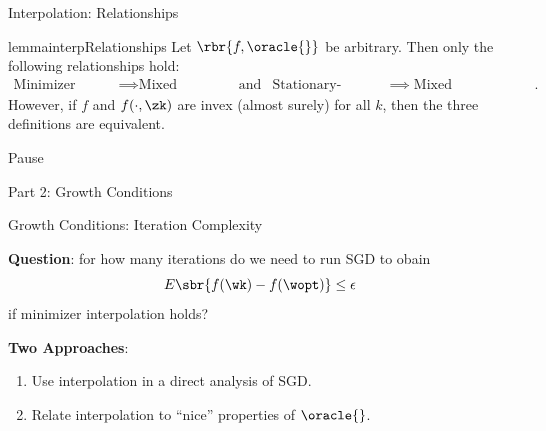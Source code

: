 \documentclass[mathserif,notheorems, hyperref={colorlinks, urlcolor=blue, linkcolor=blue}]{beamer}
\def\\{}%
\begin{document}
    \begin{frame}{Interpolation: Relationships}

        \begin{restatable}{lemma}{interpRelationships}
            Let \( \rbr{f, \oracle{}} \) be arbitrary. 
            Then only the following relationships hold: 
            \begin{align*}
                \text{Minimizer Interpolation} &\implies \text{Mixed Interpolation} \\
                                                                                       & \text{and} &\\
                \text{Stationary-Point Interpolation} &\implies \text{Mixed Interpolation}.
            \end{align*}
            However, if \( f \) and \( f(\cdot, \zk) \) are invex (almost surely) for all \( k \), then the three definitions are equivalent. 
        \end{restatable}
        
    \end{frame}
  


    \begin{frame}
       \begin{center}
          \huge Pause 
       \end{center} 
    \end{frame}


    \begin{frame}
       \begin{center}
          \huge Part 2: Growth Conditions 
       \end{center} 
    \end{frame}

    
    \begin{frame}{Growth Conditions: Iteration Complexity}
        \Large 
        
        \textbf{Question}: for how many iterations do we need to run SGD to obain 
        \[ E\sbr{f(\wk) - f(\wopt)} \leq \epsilon \] 
        if minimizer interpolation holds?

       \vspace{4ex}
       \pause 
       \textbf{Two Approaches}: 
       \begin{enumerate}
           \item Use interpolation in a direct analysis of SGD. 
           \item Relate interpolation to ``nice'' properties of \( \oracle{} \). 
       \end{enumerate}

    \end{frame}
\end{document}
